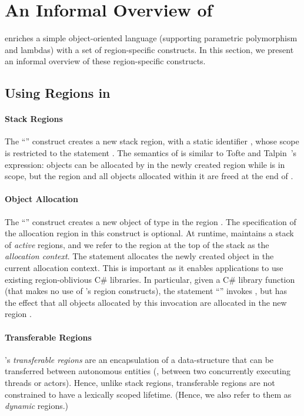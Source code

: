 \newcommand{\COMMENT}[1]{}

\section{An Informal Overview of \name} \label{sec:overview}

\name enriches a simple object-oriented language (supporting
parametric polymorphism and lambdas) with a set of region-specific
constructs.  In this section, we present an informal overview of these
region-specific constructs.

\subsection{Using Regions in \name}

\paragraph{Stack Regions} The ``'' construct
creates a new stack region, with a static identifier , whose
scope is restricted to the statement . The semantics of
 is similar to Tofte and Talpin~\cite{tofte94}'s
 expression: objects can be allocated by  in the
newly created region while  is in scope, but the region and all
objects allocated within it are freed at the end of .

\paragraph{Object Allocation} The ``'' construct creates
a new object of type  in the region . The specification of
the allocation region  in this construct is optional.  At
runtime, \name maintains a stack of \emph{active} regions, and we
refer to the region at the top of the stack as the \emph{allocation
context}. The statement  allocates the newly created object
in the current allocation context.
%
This is important as it enables \name applications to use existing
region-oblivious C\# libraries. In particular, given a  C\# library
function  (that makes no use of \name's region constructs), the
statement ``'' invokes , but has the
effect that all objects allocated by this invocation are allocated in
the new region .

\paragraph{Transferable Regions} \name's \emph{transferable regions}
are an encapsulation of a data-structure that can be transferred
between autonomous entities (\eg, between two concurrently executing
threads or actors).  Hence, unlike stack regions, transferable regions
are not constrained to have a lexically scoped lifetime.  (Hence, we
also refer to them as \emph{dynamic} regions.)

